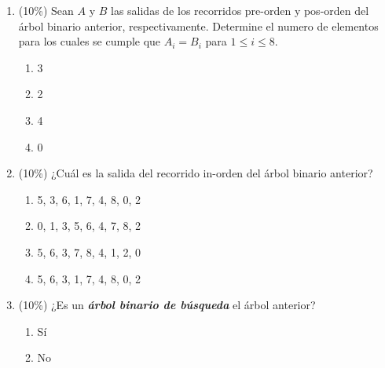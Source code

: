 \documentclass[10 pt]{article}
\begin{document}
\begin{multicols}{2}
\begin{center}
\end{center}

\begin{enumerate}[label=\alph*]
\item (10\%) Sean $A$ y $B$ las salidas de los recorridos pre-orden y pos-orden del árbol binario anterior, respectivamente. Determine el numero de elementos para los cuales se cumple que $A_i = B_i$ para $1 \leq i \leq 8$.
\begin{enumerate}[label=(\roman*)]
\item 3
\item 2
\item 4
\item 0
\end{enumerate}
\item (10\%) ¿Cuál es la salida del recorrido in-orden del árbol binario anterior?
\begin{enumerate}[label=(\roman*)]
\item 5, 3, 6, 1, 7, 4, 8, 0, 2
\item 0, 1, 3, 5, 6, 4, 7, 8, 2
\item 5, 6, 3, 7, 8, 4, 1, 2, 0
\item 5, 6, 3, 1, 7, 4, 8, 0, 2  
\end{enumerate}
\item (10\%) ¿Es un \textbf{\textit{árbol binario de búsqueda}} el árbol anterior?
\begin{enumerate}[label=(\roman*)]
\item Sí
\item No
\end{enumerate}
\end{enumerate}

\end{multicols}
\end{document}
